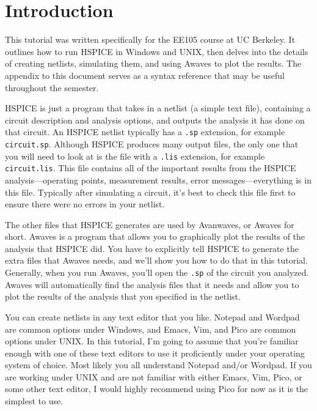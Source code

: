 \documentclass{article}
\begin{document}
\thispagestyle{plain}


\tableofcontents

\section{Introduction}

This tutorial was written specifically for the EE105 course at UC Berkeley. It outlines how to run HSPICE in Windows and UNIX, then delves into the details of creating netlists, simulating them, and using Awaves to plot the results. The appendix to this document serves as a syntax reference that may be useful throughout the semester.

HSPICE is just a program that takes in a netlist (a simple text file), containing a circuit description and analysis options, and outputs the analysis it has done on that circuit. An HSPICE netlist typically has a \verb|.sp| extension, for example \verb|circuit.sp|. Although HSPICE produces many output files, the only one that you will need to look at is the file with a \verb|.lis| extension, for example \verb|circuit.lis|. This file contains all of the important results from the HSPICE analysis---operating points, measurement results, error messages---everything is in this file. Typically after simulating a circuit, it's best to check this file first to ensure there were no errors in your netlist.

The other files that HSPICE generates are used by Avanwaves, or Awaves for short. Awaves is a program that allows you to graphically plot the results of the analysis that HSPICE did. You have to explicitly tell HSPICE to generate the extra files that Awaves needs, and we'll show you how to do that in this tutorial. Generally, when you run Awaves, you'll open the \verb|.sp| of the circuit you analyzed. Awaves will automatically find the analysis files that it needs and allow you to plot the results of the analysis that you specified in the netlist.

You can create netlists in any text editor that you like. Notepad and Wordpad are common options under Windows, and Emacs, Vim, and Pico are common options under UNIX. In this tutorial, I'm going to assume that you're familiar enough with one of these text editors to use it proficiently under your operating system of choice. Most likely you all understand Notepad and/or Wordpad. If you are working under UNIX and are not familiar with either Emacs, Vim, Pico, or some other text editor, I would highly recommend using Pico for now as it is the simplest to use.
\end{document}
